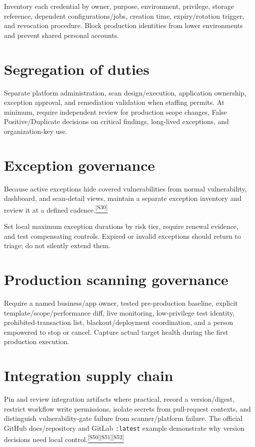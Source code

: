 \documentclass[11pt,letterpaper,oneside]{scrreprt}
\newcommand{\src}[1]{\hyperref[src:#1]{\textsuperscript{\color{R7Orange}[#1]}}}
\newcommand{\code}[1]{\texttt{#1}}
\begin{document}
\begin{oprec}
Inventory each credential by owner, purpose, environment, privilege, storage reference, dependent configurations/jobs, creation time, expiry/rotation trigger, and revocation procedure. Block production identities from lower environments and prevent shared personal accounts.
\end{oprec}

\section{Segregation of duties}
\begin{oprec}
Separate platform administration, scan design/execution, application ownership, exception approval, and remediation validation when staffing permits. At minimum, require independent review for production scope changes, False Positive/Duplicate decisions on critical findings, long-lived exceptions, and organization-key use.
\end{oprec}

\section{Exception governance}
Because active exceptions hide covered vulnerabilities from normal vulnerability, dashboard, and scan-detail views, maintain a separate exception inventory and review it at a defined cadence.\src{S30}

\begin{oprec}
Set local maximum exception durations by risk tier, require renewal evidence, and test compensating controls. Expired or invalid exceptions should return to triage; do not silently extend them.
\end{oprec}

\section{Production scanning governance}
\begin{oprec}
Require a named business/app owner, tested pre-production baseline, explicit template/scope/performance diff, live monitoring, low-privilege test identity, prohibited-transaction list, blackout/deployment coordination, and a person empowered to stop or cancel. Capture actual target health during the first production execution.
\end{oprec}

\section{Integration supply chain}
\begin{oprec}
Pin and review integration artifacts where practical, record a version/digest, restrict workflow write permissions, isolate secrets from pull-request contexts, and distinguish vulnerability-gate failure from scanner/platform failure. The official GitHub docs/repository and GitLab \code{:latest} example demonstrate why version decisions need local control.\src{S50}\src{S51}\src{S52}
\end{oprec}
\end{document}
